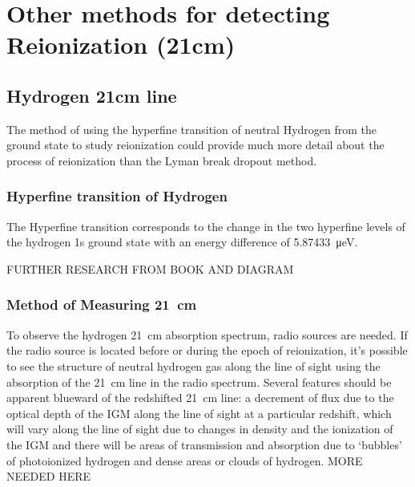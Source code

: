 
\section{Other methods for detecting Reionization (21cm)} %
\label{sec:other_methods_for_detecting_reionization}

    \subsection{Hydrogen 21cm line} %
    \label{sub:Hydrogen_21cm}
        The method of using the hyperfine transition of neutral Hydrogen from the ground state to study reionization could provide much more detail about the process of reionization than the Lyman break dropout method.

         \subsubsection{Hyperfine transition of Hydrogen} %
         \label{subsub:Hyperfine_Hydrogen}
            The Hyperfine transition corresponds to the change in the two hyperfine levels of the hydrogen 1s ground state with an energy difference of \SI{5.87433}{\micro\electronvolt}.

            FURTHER RESEARCH FROM BOOK AND DIAGRAM
	
        \subsubsection{Method of Measuring \SI{21}{\centi\metre}} %
    	\label{subsub:Measuring_21cm} 
            To observe the hydrogen \SI{21}{\centi\metre} absorption spectrum, radio sources are needed. If the radio source is located before or during the epoch of reionization, it’s possible to see the structure of neutral hydrogen gas along the line of sight using the absorption of the \SI{21}{\centi\metre} line in the radio spectrum. Several features should be apparent blueward of the redshifted \SI{21}{\centi\metre} line: a decrement of flux due to the optical depth of the IGM along the line of sight at a particular redshift, which will vary along the line of sight due to changes in density and the ionization of the IGM and there will be areas of transmission and absorption due to `bubbles' of photoionized hydrogen and dense areas or clouds of hydrogen.  MORE NEEDED HERE

